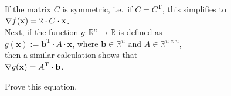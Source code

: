 If the matrix $C$ is symmetric, i.e.~if $C = C^\textrm{T}$, this simplifies to
\\[0.2cm]
\hspace*{1.3cm}
$\displaystyle \nabla f(\mathbf{x}) = 2 \cdot C \cdot \mathbf{x}$.
\\[0.2cm]
Next, if the function $g: \mathbb{R}^n \rightarrow \mathbb{R}$ is defined as 
\\[0.2cm]
\hspace*{1.3cm}
$g(\mathbf{x}) := \mathbf{b}^\textrm{T} \cdot A \cdot \mathbf{x}$, \quad where $\mathbf{b} \in \mathbb{R}^n$ and $A \in \mathbb{R}^{n \times n}$,
\\[0.2cm]
then a similar calculation shows that
\\[0.2cm]
\hspace*{1.3cm}
$\displaystyle \nabla g(\mathbf{x}) = A^\textrm{T} \cdot \mathbf{b}$.

\exercise
Prove this equation.

